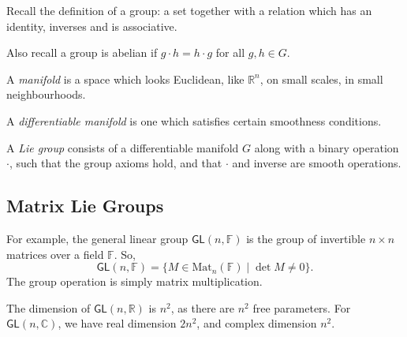 \documentclass[12pt]{article}
\begin{document}
Recall the definition of a group: a set together with a relation which has an identity, inverses and is associative.

Also recall a group is abelian if $g \cdot h = h \cdot g$ for all $g, h \in G$.


\begin{definition}
	A \emph{manifold} is a space which looks Euclidean, like $\mathbb{R}^n$, on small scales, in small neighbourhoods.

	A \emph{differentiable manifold} is one which satisfies certain smoothness conditions.
\end{definition}

\begin{definition}
	A \emph{Lie group} consists of a differentiable manifold $G$ along with a binary operation $\cdot$, such that the group axioms hold, and that $\cdot$ and inverse are smooth operations.
\end{definition}

\subsection{Matrix Lie Groups}%
\label{sub:mlg}

For example, the general linear group $\mathsf{GL}(n, \mathbb{F})$ is the group of invertible $n \times n$ matrices over a field $\mathbb{F}$. So,
\[
	\mathsf{GL}(n, \mathbb{F}) = \{ M \in \mathrm{Mat}_n(\mathbb{F}) \mid \det M \neq 0\}.
\]
The group operation is simply matrix multiplication.

The dimension of $\mathsf{GL}(n, \mathbb{R})$ is $n^2$, as there are $n^2$ free parameters. For $\mathsf{GL}(n, \mathbb{C})$, we have real dimension $2n^2$, and complex dimension $n^2$.
\end{document}
